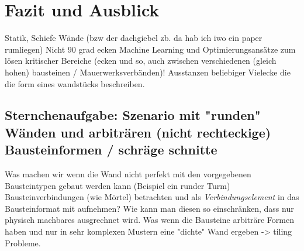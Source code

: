 \chapter{Fazit und Ausblick}
Statik, Schiefe Wände (bzw der dachgiebel zb. da hab ich iwo ein paper rumliegen)
Nicht 90 grad ecken
Machine Learning und Optimierungsansätze zum lösen kritischer Bereiche (ecken und so, auch zwischen verschiedenen (gleich hohen) bausteinen / Mauerwerksverbänden)!
Ausstanzen beliebiger Vielecke die die form eines wandstücks beschreiben.
\section{Sternchenaufgabe: Szenario mit "runden" Wänden und arbiträren (nicht rechteckige) Bausteinformen / schräge schnitte}
Was machen wir wenn die Wand nicht perfekt mit den vorgegebenen Bausteintypen gebaut werden kann (Beispiel ein runder Turm)
Bausteinverbindungen (wie Mörtel) betrachten und als \textit{Verbindungselement} in das Bausteinformat mit aufnehmen? Wie kann man diesen so einschränken, dass nur physisch machbares ausgrechnet wird.
Was wenn die Bausteine arbiträre Formen haben und nur in sehr komplexen Mustern eine "dichte" Wand ergeben -> tiling Probleme.
